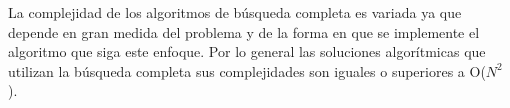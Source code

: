 La complejidad de los algoritmos de búsqueda completa es variada ya que depende en gran medida del problema y de la forma en que se implemente el algoritmo que siga este enfoque. Por lo general las soluciones algorítmicas que utilizan la búsqueda completa sus complejidades son iguales o superiores a O($N^2$).